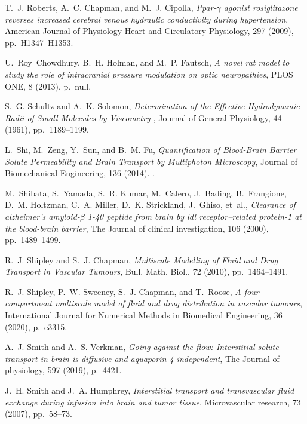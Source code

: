 \documentclass[10pt,letterpaper]{article}
\newcommand{\1}{^{(1)}}
\newcommand{\2}{^{(2)}}
\begin{document}
\begin{thebibliography}{10}
{\sc T.~J. Roberts, A.~C. Chapman, and M.~J. Cipolla}, {\em Ppar-$\gamma$
  agonist rosiglitazone reverses increased cerebral venous hydraulic
  conductivity during hypertension}, American Journal of Physiology-Heart and
  Circulatory Physiology, 297 (2009), pp.~H1347--H1353.

{\sc U.~Roy~Chowdhury, B.~H. Holman, and M.~P. Fautsch}, {\em A novel rat model
  to study the role of intracranial pressure modulation on optic neuropathies},
  PLOS ONE, 8 (2013), p.~null.

{\sc S.~G. Schultz and A.~K. Solomon}, {\em {Determination of the Effective
  Hydrodynamic Radii of Small Molecules by Viscometry }}, Journal of General
  Physiology, 44 (1961), pp.~1189--1199.

{\sc L.~Shi, M.~Zeng, Y.~Sun, and B.~M. Fu}, {\em {Quantification of
  Blood-Brain Barrier Solute Permeability and Brain Transport by Multiphoton
  Microscopy}}, Journal of Biomechanical Engineering, 136 (2014).
.

{\sc M.~Shibata, S.~Yamada, S.~R. Kumar, M.~Calero, J.~Bading, B.~Frangione,
  D.~M. Holtzman, C.~A. Miller, D.~K. Strickland, J.~Ghiso, et~al.}, {\em
  Clearance of alzheimer’s amyloid-$\beta$ 1-40 peptide from brain by ldl
  receptor--related protein-1 at the blood-brain barrier}, The Journal of
  clinical investigation, 106 (2000), pp.~1489--1499.

{\sc R.~J. Shipley and S.~J. Chapman}, {\em Multiscale {Modelling} of {Fluid}
  and {Drug} {Transport} in {Vascular} {Tumours}}, Bull. Math. Biol., 72
  (2010), pp.~1464--1491.

{\sc R.~J. Shipley, P.~W. Sweeney, S.~J. Chapman, and T.~Roose}, {\em A
  four-compartment multiscale model of fluid and drug distribution in vascular
  tumours}, International Journal for Numerical Methods in Biomedical
  Engineering, 36 (2020), p.~e3315.

{\sc A.~J. Smith and A.~S. Verkman}, {\em Going against the flow: Interstitial
  solute transport in brain is diffusive and aquaporin-4 independent}, The
  Journal of physiology, 597 (2019), p.~4421.

{\sc J.~H. Smith and J.~A. Humphrey}, {\em Interstitial transport and
  transvascular fluid exchange during infusion into brain and tumor tissue},
  Microvascular research, 73 (2007), pp.~58--73.


\end{thebibliography}
\end{document}
